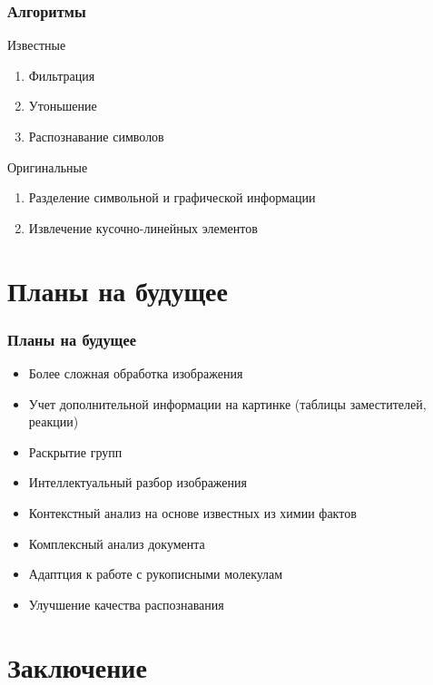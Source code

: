 \begin{frame}
  \frametitle{Алгоритмы}

  Известные

  \begin{enumerate}
    \item Фильтрация
    \item Утоньшение 
    \item Распознавание символов
  \end{enumerate}
      
  Оригинальные

  \begin{enumerate}
    \item Разделение символьной и графической информации
    \item Извлечение кусочно-линейных элементов
  \end{enumerate}
\end{frame}

\section{Планы на будущее}

\begin{frame}
  \frametitle{Планы на будущее}
  \begin{itemize}
    \item Более сложная обработка изображения
    \item Учет дополнительной информации на картинке (таблицы заместителей, реакции)
    \item Раскрытие групп
    \item Интеллектуальный разбор изображения
    \item Контекстный анализ на основе известных из химии фактов
    \item Комплексный анализ документа
    \item Адаптция к работе с рукописными молекулам
    \item Улучшение качества распознавания
  \end{itemize}
\end{frame}

\section{Заключение}

